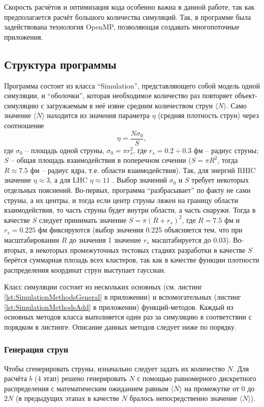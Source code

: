 Скорость расчётов и оптимизация кода особенно важна в данной работе, так как предполагается расчёт большого количества симуляций. Так, в программе была задействована технология OpenMP, позволяющая создавать многопоточные приложения. 
\subsection{Структура программы}
Программа состоит из класса ``Simulation'', представляющего собой модель одной симуляции, и ``оболочки'', которая необходимое количество раз повторяет объект-симуляцию с загружаемым в неё извне средним количеством струн $\langle N \rangle$. Само значение $\langle N \rangle$ находится из значения параметра $\eta$ (средняя плотность струн) через соотношение
\begin{equation} \label{eq:eta}
	\eta = \frac{N \sigma_0}{S},
\end{equation}
где $\sigma_0$ -- площадь одной струны, $\sigma_0 = \pi r_s^2$, где $r_s = 0.2 \div 0.3$ фм -- радиус струны; $S$ -- общая площадь взаимодействия в поперечном сечении ($S = \pi R^2$, тогда $R \approx 7.5$ фм -- радиус ядра, т.е. области взаимодействия). Так, для энергий RHIC значение $\eta \approx 3$, а для LHC $\eta \approx 11$ \cite{RHICandLHC}. Выбор значений $\sigma_0$ и $S$ требует некоторых отдельных пояснений. Во-первых, программа ``разбрасывает'' по факту не сами струны, а их центры, и тогда если центр струны ляжен на границу области взаимодействия, то часть струны будет внутри области, а часть снаружи. Тогда в качестве $S$ следует принимать значение $S = \pi (R + r_s)^2$, где $R = 7.5$ фм и $r_s = 0.225$ фм фиксируются (выбор значения 0.225 объясняется тем, что при масштабировании $R$ до значения 1 значение $r_s$ масштабируется до 0.03). Во-вторых, в некоторых промежуточных тестовых стадиях разработки в качестве $S$ берётся суммарная плозадь всех кластеров, так как в качестве функции плотности распределения координат струн выступает гауссиан.

Класс симуляции состоит из нескольких основных (см. листинг \ref{lst:SimulationMethodsGeneral} в приложении) и вспомогательных (листинг \ref{lst:SimulationMethodsAdd} в приложении) функций-методов. Каждый из основных методов класса выполняется один раз за симуляцию в соответствии с порядком в листинге. Описание данных методов следует ниже по порядку.
\subsubsection{Генерация струн}
Чтобы сгенерировать струны, изначально следует задать их количество $N$. Для расчёта $b$ (4 этап) решено генерировать $N$ с помощью равномерного дискретного распределения с математическим ожиданием равным $\langle N \rangle$ на промежутке от 0 до $2N$ (в предыдущих этапах в качестве $N$ бралось непосредственно значение $\langle N \rangle$). 

